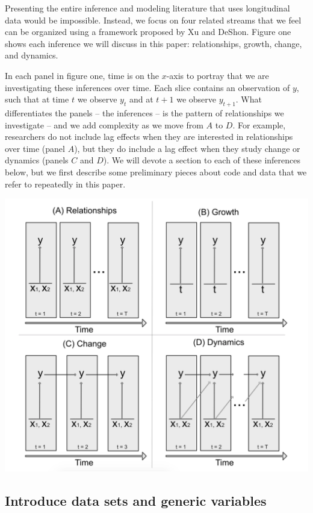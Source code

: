 \documentclass[english,,man]{apa6}
\theoremstyle{definition}
\theoremstyle{definition}
\theoremstyle{definition}
\theoremstyle{remark}
\begin{document}
Presenting the entire inference and modeling literature that uses
longitudinal data would be impossible. Instead, we focus on four related
streams that we feel can be organized using a framework proposed by Xu
and DeShon. Figure one shows each inference we will discuss in this
paper: relationships, growth, change, and dynamics.

In each panel in figure one, time is on the \(x\)-axis to portray that
we are investigating these inferences over time. Each slice contains an
observation of \(y\), such that at time \(t\) we observe \(y_{t}\) and
at \(t + 1\) we observe \(y_{t + 1}\). What differentiates the panels --
the inferences -- is the pattern of relationships we investigate -- and
we add complexity as we move from \(A\) to \(D\). For example,
researchers do not include lag effects when they are interested in
relationships over time (panel \(A\)), but they do include a lag effect
when they study change or dynamics (panels \(C\) and \(D\)). We will
devote a section to each of these inferences below, but we first
describe some preliminary pieces about code and data that we refer to
repeatedly in this paper.

\includegraphics{figures/common_models.png}

\hypertarget{introduce-data-sets-and-generic-variables}{%
\subsection{Introduce data sets and generic
variables}\label{introduce-data-sets-and-generic-variables}}
\end{document}
